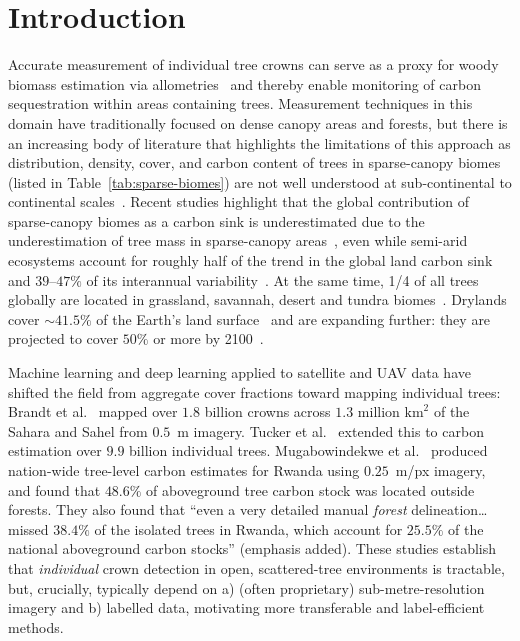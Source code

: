 \documentclass[remotesensing,article,submit,moreauthors]{Definitions/mdpi}
\begin{document}
\section{Introduction}


Accurate measurement of individual tree crowns can serve as a proxy for woody biomass estimation via allometries~\cite{hiernaux2023,tucker2023} and thereby enable monitoring of carbon sequestration within areas containing trees. Measurement techniques in this domain have traditionally focused on dense canopy areas and forests, but there is an increasing body of literature that highlights the limitations of this approach as distribution, density, cover, and carbon content of trees in sparse-canopy biomes (listed in Table~\ref{tab:sparse-biomes}) are not well understood at sub-continental to continental scales~\cite{tucker2023,selvabox,fagan2020}. Recent studies highlight that the global contribution of sparse-canopy biomes as a carbon sink is underestimated due to the underestimation of tree mass in sparse-canopy areas~\cite{bastin2017,tucker2023,brandt2020,skole2021}, even while semi-arid ecosystems account for roughly half of the trend in the global land carbon sink and $39$--$47\%$ of its interannual variability~\cite{ahlstrom2015}. At the same time, 1/4 of all trees globally are located in grassland, savannah, desert and tundra biomes~\cite{crowther2015}. Drylands cover ${\sim}41.5\%$ of the Earth's land surface~\cite{sorensen2007,bastin2017} and are expanding further: they are projected to cover $50\%$ or more by 2100~\cite{huang2016}.


Machine learning and deep learning applied to satellite and UAV data have shifted the field from aggregate cover fractions toward mapping individual trees: Brandt et al.~\cite{brandt2020} mapped over $1.8$ billion crowns across $1.3$ million $\mathrm{km}^2$ of the Sahara and Sahel from $0.5$~m imagery. Tucker et al.~\cite{tucker2023} extended this to carbon estimation over $9.9$ billion individual trees. Mugabowindekwe et al.~\cite{mugabowindekwe2023} produced nation-wide tree-level carbon estimates for Rwanda using $0.25$~m/px imagery, and found that $48.6\%$ of aboveground tree carbon stock was located outside forests. They also found that ``even a very detailed manual \emph{forest} delineation\ldots missed $38.4\%$ of the isolated trees in Rwanda, which account for $25.5\%$ of the national aboveground carbon stocks'' (emphasis added). These studies establish that \emph{individual} crown detection in open, scattered-tree environments is tractable, but, crucially, typically depend on a) (often proprietary) sub-metre-resolution imagery and b) labelled data, motivating more transferable and label-efficient methods.
\end{document}
